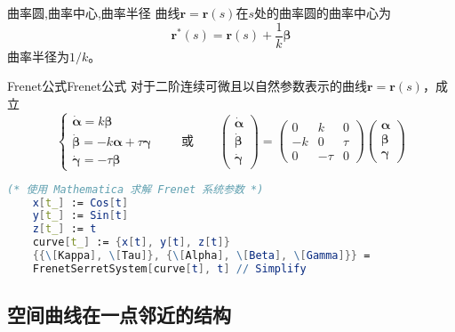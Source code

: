 \documentclass[lang = cn, scheme = chinese, thmcnt = section]{elegantbook}
\newcommand{\bs}{\boldsymbol}          %
\begin{document}
\begin{definition}{曲率圆,曲率中心,曲率半径}
	曲线$\bs{r}=\bs{r}(s)$在$s$处的曲率圆的曲率中心为
	$$
	\bs{r}^*(s)=\bs{r}(s)+\frac{1}{k}\bs{\beta}
	$$
	曲率半径为$1/k$。
\end{definition}

\begin{theorem}{Frenet公式}{Frenet公式}
	对于二阶连续可微且以自然参数表示的曲线$\bs{r}=\bs{r}(s)$，成立
	$$
	\begin{cases}
		\dot{\bs{\alpha}}=k\bs{\beta}\\
		\dot{\bs{\beta}}=-k\bs{\alpha}+\tau\bs{\gamma}\\
		\dot{\bs{\gamma}}=-\tau\bs{\beta}
	\end{cases}
	\qquad 
	\text{或}
	\qquad
	\begin{pmatrix}
		\dot{\bs{\alpha}}\\\dot{\bs{\beta}}\\\dot{\bs{\gamma}}
	\end{pmatrix}
	=\begin{pmatrix}
		0 & k & 0 \\
		-k & 0 & \tau\\
		0 & -\tau & 0
	\end{pmatrix}
	\begin{pmatrix}
		\bs{\alpha}\\\bs{\beta}\\\bs{\gamma}
	\end{pmatrix}
	$$
\end{theorem}

\begin{lstlisting}[language = Mathematica]
	(* 使用 Mathematica 求解 Frenet 系统参数 *)
	x[t_] := Cos[t]
	y[t_] := Sin[t]
	z[t_] := t
	curve[t_] := {x[t], y[t], z[t]}
	{{\[Kappa], \[Tau]}, {\[Alpha], \[Beta], \[Gamma]}} = 
	FrenetSerretSystem[curve[t], t] // Simplify
\end{lstlisting}

\subsection{空间曲线在一点邻近的结构}
\end{document}
